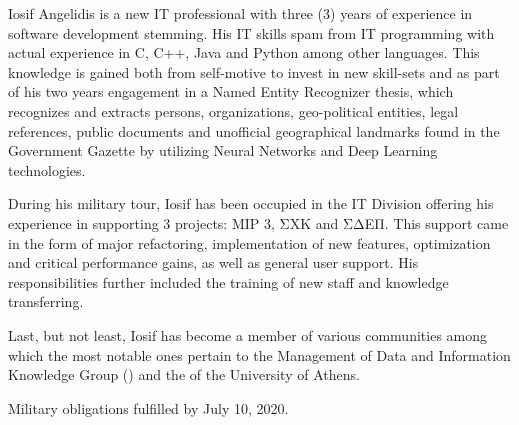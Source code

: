 \par{
Iosif Angelidis is a new IT professional with three (3) years of experience in software development stemming. His IT skills spam from IT programming with actual experience in C, C++, Java and Python among other languages. This knowledge is gained both from self-motive to invest in new skill-sets and as part of his two years engagement in a Named Entity Recognizer thesis, which recognizes and extracts persons, organizations, geo-political entities, legal references, public documents and unofficial geographical landmarks found in the Government Gazette by utilizing Neural Networks and Deep Learning technologies.}

\par{During his military tour, Iosif has been occupied in the IT Division offering his experience in supporting 3 projects: MIP 3, ΣΧΚ and ΣΔΕΠ. This support came in the form of major refactoring, implementation of new features, optimization and critical performance gains, as well as general user support. His responsibilities further included the training of new staff and knowledge transferring.}

\par{Last, but not least, Iosif has become a member of various communities among which the most notable ones pertain to the Management of Data and Information Knowledge Group () and the  of the University of Athens. }

\par{Military obligations fulfilled by July 10, 2020.
}
